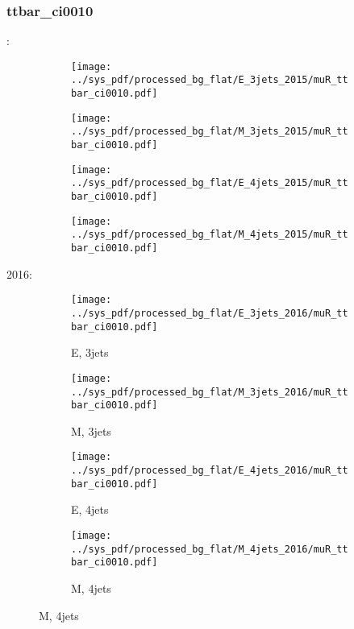 \documentclass{beamer}
\begin{document}
\begin{frame}
\frametitle{ttbar_ci0010}
\fontsize{5}{1}:
\begin{figure}
\centering
\begin{subfigure}[b]{0.24\textwidth}
\texttt{[image: ../sys\_pdf/processed\_bg\_flat/E\_3jets\_2015/muR\_ttbar\_ci0010.pdf]}
\end{subfigure}
\begin{subfigure}[b]{0.24\textwidth}
\texttt{[image: ../sys\_pdf/processed\_bg\_flat/M\_3jets\_2015/muR\_ttbar\_ci0010.pdf]}
\end{subfigure}
\begin{subfigure}[b]{0.24\textwidth}
\texttt{[image: ../sys\_pdf/processed\_bg\_flat/E\_4jets\_2015/muR\_ttbar\_ci0010.pdf]}
\end{subfigure}
\begin{subfigure}[b]{0.24\textwidth}
\texttt{[image: ../sys\_pdf/processed\_bg\_flat/M\_4jets\_2015/muR\_ttbar\_ci0010.pdf]}
\end{subfigure}
\end{figure}
2016:
\begin{figure}
\centering
\begin{subfigure}[b]{0.24\textwidth}
\texttt{[image: ../sys\_pdf/processed\_bg\_flat/E\_3jets\_2016/muR\_ttbar\_ci0010.pdf]}
\captionsetup{font=tiny}
\caption{E, 3jets}
\end{subfigure}
\begin{subfigure}[b]{0.24\textwidth}
\texttt{[image: ../sys\_pdf/processed\_bg\_flat/M\_3jets\_2016/muR\_ttbar\_ci0010.pdf]}
\captionsetup{font=tiny}
\caption{M, 3jets}
\end{subfigure}
\begin{subfigure}[b]{0.24\textwidth}
\texttt{[image: ../sys\_pdf/processed\_bg\_flat/E\_4jets\_2016/muR\_ttbar\_ci0010.pdf]}
\captionsetup{font=tiny}
\caption{E, 4jets}
\end{subfigure}
\begin{subfigure}[b]{0.24\textwidth}
\texttt{[image: ../sys\_pdf/processed\_bg\_flat/M\_4jets\_2016/muR\_ttbar\_ci0010.pdf]}
\captionsetup{font=tiny}
\caption{M, 4jets}
\end{subfigure}
\end{figure}
\end{frame}
\end{document}
